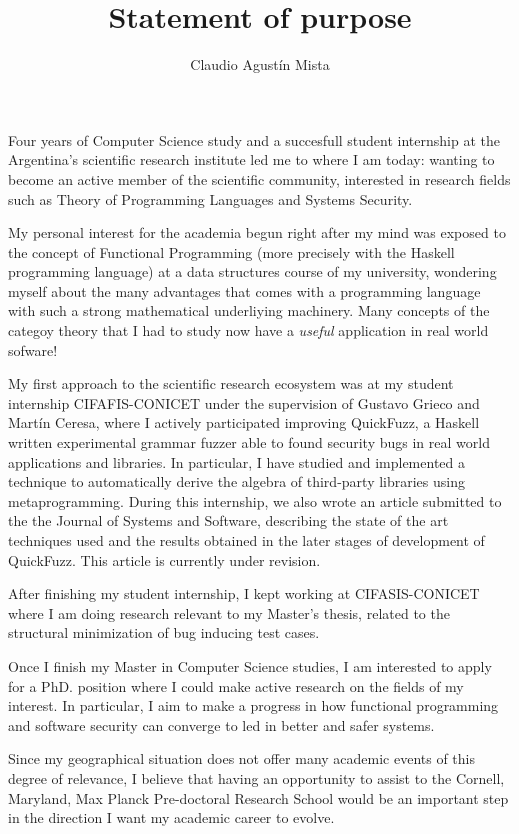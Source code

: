 \documentclass[helvetica,openbib,logo,notitle,flagCMYK,totpages]{europecv}
\title{Statement of purpose}
\author{Claudio Agust\'in Mista}
\date{}
\begin{document}

\maketitle 
   
    Four years of Computer Science study and a succesfull student internship at
    the Argentina's scientific research institute led me to where I am today:
    wanting to become an active member of the scientific community, interested
    in research fields such as Theory of Programming Languages and Systems
    Security. 

    My personal interest for the academia begun right after my mind was exposed
    to the concept of Functional Programming (more precisely with the Haskell
    programming language) at a data structures course of my university,
    wondering myself about the many advantages that comes with a programming
    language with such a strong mathematical underliying machinery. Many
    concepts of the categoy theory that I had to study now have a \emph{useful}
    application in real world sofware! 

    My first approach to the scientific research ecosystem was at my student
    internship CIFAFIS-CONICET under the supervision of Gustavo Grieco and
    Mart\'in Ceresa, where I actively participated improving QuickFuzz, a
    Haskell written experimental grammar fuzzer able to found security bugs in
    real world applications and libraries. In particular, I have studied and
    implemented a technique to automatically derive the algebra of third-party
    libraries using metaprogramming. During this internship, we also wrote an
    article submitted to the the Journal of Systems and Software, describing
    the state of the art techniques used and the results obtained in the later
    stages of development of QuickFuzz. This article is currently under
    revision. 

    After finishing my student internship, I kept working at CIFASIS-CONICET
    where I am doing research relevant to my Master's thesis, related to the
    structural minimization of bug inducing test cases.   

    Once I finish my Master in Computer Science studies, I am interested to
    apply for a PhD. position where I could make active research on the fields
    of my interest. In particular, I aim to make a progress in how functional
    programming and software security can converge to led in better and safer
    systems.

    Since my geographical situation does not offer many academic events of this
    degree of relevance, I believe that having an opportunity to assist to the
    Cornell, Maryland, Max Planck Pre-doctoral Research School would be an
    important step in the direction I want my academic career to evolve.
\end{document}
